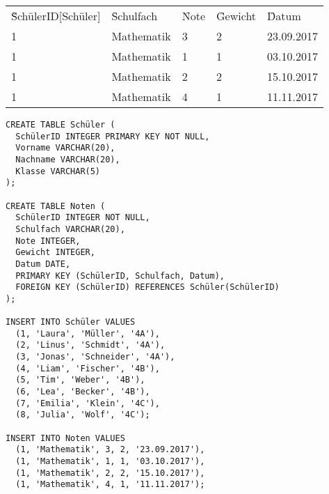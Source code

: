 \documentclass{bschlangaul-aufgabe}
\begin{document}

\begin{center}
\begin{tabular}{|lllll|}
\hline
\f{\u{SchülerID{[}Schüler{]}}} & \f{Schulfach}  & \f{Note} & \f{Gewicht} & \f{Datum}  \\
1                              & Mathematik     & 3        & 2           & 23.09.2017 \\
1                              & Mathematik     & 1        & 1           & 03.10.2017 \\
1                              & Mathematik     & 2        & 2           & 15.10.2017 \\
1                              & Mathematik     & 4        & 1           & 11.11.2017 \\
\hline
\end{tabular}
\end{center}

\begin{bAdditum}[Übungsdatenbank]
\begin{verbatim}
CREATE TABLE Schüler (
  SchülerID INTEGER PRIMARY KEY NOT NULL,
  Vorname VARCHAR(20),
  Nachname VARCHAR(20),
  Klasse VARCHAR(5)
);

CREATE TABLE Noten (
  SchülerID INTEGER NOT NULL,
  Schulfach VARCHAR(20),
  Note INTEGER,
  Gewicht INTEGER,
  Datum DATE,
  PRIMARY KEY (SchülerID, Schulfach, Datum),
  FOREIGN KEY (SchülerID) REFERENCES Schüler(SchülerID)
);

INSERT INTO Schüler VALUES
  (1, 'Laura', 'Müller', '4A'),
  (2, 'Linus', 'Schmidt', '4A'),
  (3, 'Jonas', 'Schneider', '4A'),
  (4, 'Liam', 'Fischer', '4B'),
  (5, 'Tim', 'Weber', '4B'),
  (6, 'Lea', 'Becker', '4B'),
  (7, 'Emilia', 'Klein', '4C'),
  (8, 'Julia', 'Wolf', '4C');

INSERT INTO Noten VALUES
  (1, 'Mathematik', 3, 2, '23.09.2017'),
  (1, 'Mathematik', 1, 1, '03.10.2017'),
  (1, 'Mathematik', 2, 2, '15.10.2017'),
  (1, 'Mathematik', 4, 1, '11.11.2017');
\end{verbatim}
\end{bAdditum}
\end{document}
